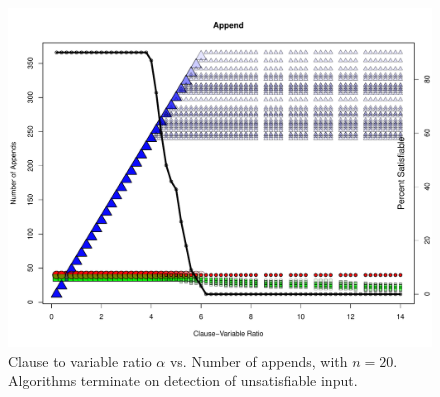 \begin{figure}[htdp]

\begin{center}

\includegraphics[width=1.1\textwidth]{./figures/metricOutput_n20-earlyExit/appendCount.pdf}

\caption{Clause to variable ratio $\alpha$ vs. Number of appends, with $n = 20$.  Algorithms terminate on detection of unsatisfiable input. }
\label{appendFig_10}
\end{center}
\end{figure}

\FloatBarrier
			
